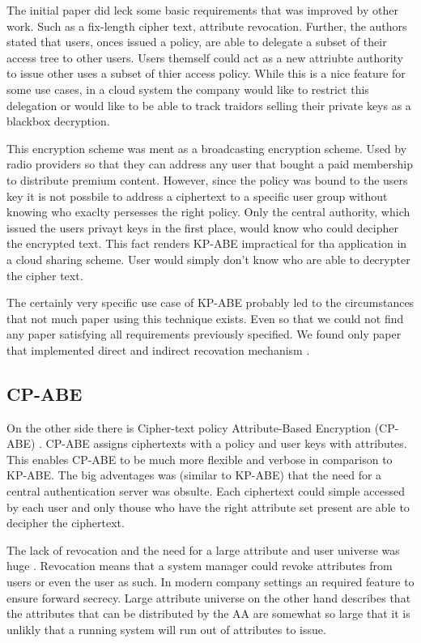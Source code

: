 The initial paper did leck some basic requirements that was improved by other work. Such as a fix-length cipher text, attribute revocation. Further, the authors stated that users, onces issued a policy, are able to delegate a subset of their access tree to other users. Users themself could act as a new attriubte authority to issue other uses a subset of thier access policy. While this is a nice feature for some use cases, in a cloud system the company would like to restrict this delegation or would like to be able to track traidors selling their private keys as a blackbox decryption.

This encryption scheme was ment as a broadcasting encryption scheme. Used by radio providers so that they can address any user that bought a paid membership to distribute premium content. However, since the policy was bound to the users key it is not possbile to address a ciphertext to a specific user group without knowing who exaclty persesses the right policy. Only the central authority, which issued the users privayt keys in the first place, would know who could decipher the encrypted text. This fact renders KP-ABE impractical for tha application in a cloud sharing scheme. User would simply don't know who are able to decrypter the cipher text. 

The certainly very specific use case of KP-ABE probably led to the circumstances that not much paper using this technique exists. Even so that we could not find any paper satisfying all requirements previously specified. We found only paper that implemented direct and indirect recovation mechanism \cite{shi2015directly}. 

\subsection{CP-ABE}
On the other side there is Cipher-text policy Attribute-Based Encryption (CP-ABE) \cite{bethencourt2007ciphertext}. CP-ABE assigns ciphertexts with a policy and user keys with attributes. This enables CP-ABE to be much more flexible and verbose in comparison to KP-ABE. The big adventages was (similar to KP-ABE) that the need for a central authentication server was obsulte. Each ciphertext could simple accessed by each user and only thouse who have the right attribute set present are able to decipher the ciphertext. 

The lack of revocation  and the need for a large attribute and user universe was huge . Revocation means that a system manager could revoke attributes from users or even the user as such. In modern company settings an required feature to ensure forward secrecy. Large attribute universe on the other hand describes that the attributes that can be distributed by the AA are somewhat so large that it is unlikly that a running system will run out of attributes to issue. 

